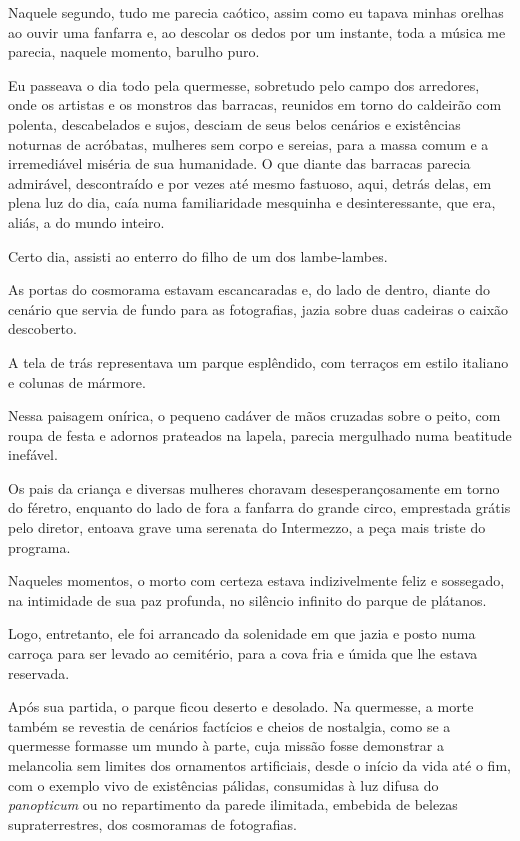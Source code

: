 Naquele segundo, tudo me parecia caótico, assim como eu tapava minhas orelhas ao ouvir uma fanfarra e, ao descolar os dedos por um instante, toda a música me parecia, naquele momento, barulho puro.

Eu passeava o dia todo pela quermesse, sobretudo pelo campo dos arredores, onde os artistas e os monstros das barracas, reunidos em torno do caldeirão com polenta, descabelados e sujos, desciam de seus belos cenários e existências noturnas de acróbatas, mulheres sem corpo e sereias, para a massa comum e a irremediável miséria de sua humanidade. O que diante das barracas parecia admirável, descontraído e por vezes até mesmo fastuoso, aqui, detrás delas, em plena luz do dia, caía numa familiaridade mesquinha e desinteressante, que era, aliás, a do mundo inteiro.

Certo dia, assisti ao enterro do filho de um dos lambe-lambes.

As portas do cosmorama estavam escancaradas e, do lado de dentro, diante do cenário que servia de fundo para as fotografias, jazia sobre duas cadeiras o caixão descoberto.

A tela de trás representava um parque esplêndido, com terraços em estilo italiano e colunas de mármore.

Nessa paisagem onírica, o pequeno cadáver de mãos cruzadas sobre o peito, com roupa de festa e adornos prateados na lapela, parecia mergulhado numa beatitude inefável.

Os pais da criança e diversas mulheres choravam desesperançosamente em torno do féretro, enquanto do lado de fora a fanfarra do grande circo, emprestada grátis pelo diretor, entoava grave uma serenata do Intermezzo, a peça mais triste do programa.

Naqueles momentos, o morto com certeza estava indizivelmente feliz e sossegado, na intimidade de sua paz profunda, no silêncio infinito do parque de plátanos.

Logo, entretanto, ele foi arrancado da solenidade em que jazia e posto numa carroça para ser levado ao cemitério, para a cova fria e úmida que lhe estava reservada.

Após sua partida, o parque ficou deserto e desolado. Na quermesse, a morte também se revestia de cenários factícios e cheios de nostalgia, como se a quermesse formasse um mundo à parte, cuja missão fosse demonstrar a melancolia sem limites dos ornamentos artificiais, desde o início da vida até o fim, com o exemplo vivo de existências pálidas, consumidas à luz difusa do \textit{panopticum} ou no repartimento da parede ilimitada, embebida de belezas supraterrestres, dos cosmoramas de fotografias. 


